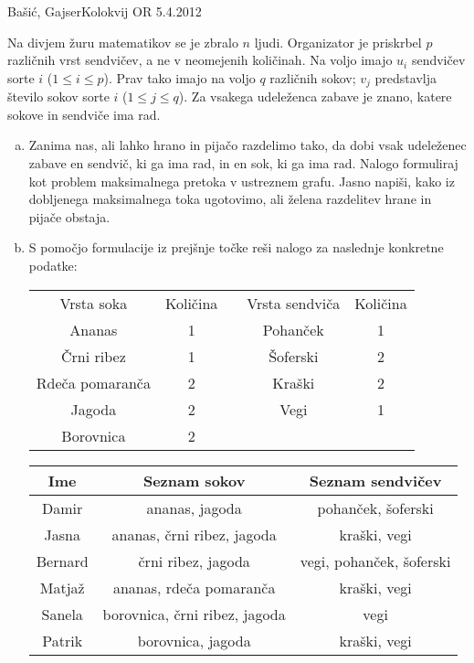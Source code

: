 \begin{naloga}{Bašić, Gajser}{Kolokvij OR 5.4.2012}
\begin{vprasanje}
Na divjem žuru matematikov se je zbralo $n$ ljudi.
Organizator je priskrbel $p$ različnih vrst sendvičev,
a ne v neomejenih količinah.
Na voljo imajo $u_i$ sendvičev sorte $i$ ($1 \le i \le p$).
Prav tako imajo na voljo $q$ različnih sokov;
$v_j$ predstavlja število sokov sorte $i$ ($1 \le j \le q$).
Za vsakega udeleženca zabave je znano,
katere sokove in sendviče ima rad.

\begin{enumerate}[(a)]
\item Zanima nas, ali lahko hrano in pijačo razdelimo tako,
da dobi vsak udeleženec zabave en sendvič, ki ga ima rad,
in en sok, ki ga ima rad.
Nalogo formuliraj kot problem maksimalnega pretoka v ustreznem grafu.
Jasno napiši, kako iz dobljenega maksimalnega toka ugotovimo,
ali želena razdelitev hrane in pijače obstaja.

\item S pomočjo formulacije iz prejšnje točke
reši nalogo za naslednje konkretne podatke:
\begin{center}
\begin{tabular}{c|ccc|c}
Vrsta soka & Količina & \quad & Vrsta sendviča & Količina \\
\cline{1-2} \cline{4-5}
Ananas          & 1 && Pohanček & 1 \\
Črni ribez      & 1 && Šoferski & 2 \\
Rdeča pomaranča & 2 && Kraški   & 2 \\
Jagoda          & 2 && Vegi     & 1 \\
Borovnica       & 2
\end{tabular}

\bigskip
\begin{tabular}{c|c|c}
Ime & Seznam sokov & Seznam sendvičev \\ \hline
Damir   & ananas, jagoda                & pohanček, šoferski       \\
Jasna   & ananas, črni ribez, jagoda    & kraški, vegi             \\
Bernard & črni ribez, jagoda            & vegi, pohanček, šoferski \\
Matjaž  & ananas, rdeča pomaranča       & kraški, vegi             \\
Sanela  & borovnica, črni ribez, jagoda & vegi                     \\
Patrik  & borovnica, jagoda             & kraški, vegi
\end{tabular}
\end{center}
\end{enumerate}
\end{vprasanje}


\end{naloga}
